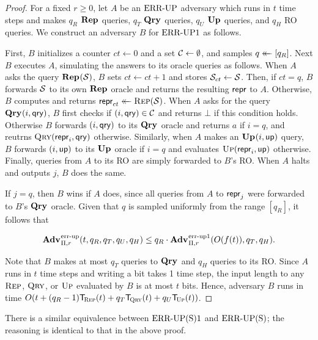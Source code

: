 \begin{proof}For a fixed $r \ge 0$, let $A$ be an $\textnormal{ERR\mbox{-}UP}$ adversary which runs in $t$ time steps and makes $q_R$ $\mathbf{Rep}\hspace{0.5pt}$ queries, $q_T$ $\mathbf{Qry}\hspace{0.5pt}$ queries, $q_U$ $\mathbf{Up}\hspace{0.5pt}$ queries, and $q_H$ RO queries. We construct an adversary $B$ for $\textnormal{ERR\mbox{-}UP}1$ as follows.

First, $B$ initializes a counter $ct \gets 0$ and a set $\mathcal{C} \gets \emptyset$, and samples $q \mathrel{\leftarrow\mkern-14mu\leftarrow} [q_R]$. Next $B$ executes $A$, simulating the answers to its oracle queries as follows. When $A$ asks the query $\mathbf{Rep}\hspace{0.5pt}(\mathcal{S})$, $B$ sets $ct \gets ct + 1$ and stores $\mathcal{S}_{ct} \gets \mathcal{S}$. Then, if $ct = q$, $B$ forwards $\mathcal{S}$ to its own $\mathbf{Rep}\hspace{0.5pt}$ oracle and returns the resulting $\mathsf{repr}$ to $A$. Otherwise, $B$ computes and returns $\mathsf{repr}_{ct} \mathrel{\leftarrow\mkern-14mu\leftarrow} \textsc{Rep}(\mathcal{S})$. When $A$ asks for the query $\mathbf{Qry}\hspace{0.5pt}(i,\mathsf{qry})$, $B$ first checks if $(i,\mathsf{qry}) \in \mathcal{C}$ and returns $\bot$ if this condition holds. Otherwise $B$ forwards $(i,\mathsf{qry})$ to its $\mathbf{Qry}\hspace{0.5pt}$ oracle and returns $a$ if $i = q$, and reutrns $\textsc{Qry}(\mathsf{repr}_i,\mathsf{qry})$ otherwise. Similarly, when $A$ makes an $\mathbf{Up}\hspace{0.5pt}(i,\mathsf{up})$ query, $B$ forwards $(i,\mathsf{up})$ to its $\mathbf{Up}\hspace{0.5pt}$ oracle if $i = q$ and evaluates $\textsc{Up}(\mathsf{repr}_i,\mathsf{up})$ otherwise. Finally, queries from $A$ to its RO are simply forwarded to $B$'s RO. When $A$ halts and outputs $j$, $B$ does the same.

If $j = q$, then $B$ wins if $A$ does, since all queries from $A$ to $\mathsf{repr}_j$ were forwarded to $B$'s $\mathbf{Qry}\hspace{0.5pt}$ oracle. Given that $q$ is sampled uniformly from the range $[q_R]$, it follows that

$$\Adv{\errep}_{\struct,r}(t, q_R, q_T, q_U, q_H) \leq q_R\cdot\Adv{\errep1}_{\struct,r}(O(f(t)), q_T, q_H).$$

Note that $B$ makes at most $q_T$ queries to $\mathbf{Qry}\hspace{0.5pt}$ and $q_H$ queries to its RO. Since $A$ runs in $t$ time steps and writing a bit takes 1 time step, the input length to any $\textsc{Rep}$, $\textsc{Qry}$, or $\textsc{Up}$ evaluated by $B$ is at most $t$ bits. Hence, adversary $B$ runs in time $O(t+(q_R-1)\ticks(\Rep,t)+q_T\ticks(\Qry,t)+q_U\ticks(\Up,t))$.\missingqed
\end{proof}


There is a similar equivalence between $\textnormal{ERR\mbox{-}UP(S)}1$ and $\textnormal{ERR\mbox{-}UP(S)}$; the reasoning is identical to that in the above proof. 

